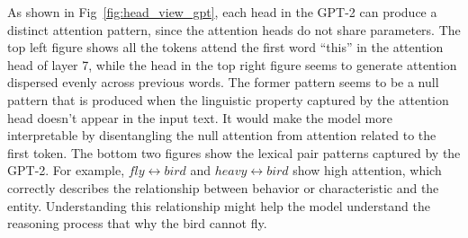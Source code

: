 \documentclass[]{article}
\begin{document}
As shown in Fig~\ref{fig:head_view_gpt}, each head in the GPT-2 can produce a distinct attention pattern, since the attention heads do not share parameters. 
The top left figure shows all the tokens attend the first word ``this'' in the attention head of layer 7, while the head in the top right figure seems to generate attention dispersed evenly across previous
words.
The former pattern seems to be a null pattern that is produced when the linguistic property captured by the attention head doesn't appear in the input text. 
It would make the model more interpretable by disentangling the null attention from attention related to the first token.
The bottom two figures show the lexical pair patterns captured by the GPT-2. 
For example, $fly\leftrightarrow bird$ and $heavy\leftrightarrow bird$ show high attention, which correctly describes the relationship between behavior or characteristic and the entity.
Understanding this relationship might help the model understand the reasoning process that why the bird cannot fly. 
\end{document}
